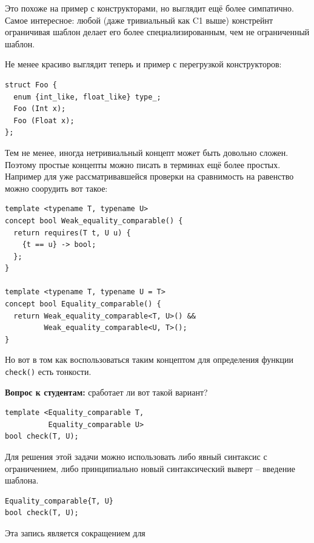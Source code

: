 \documentclass[a4paper,12pt,oneside]{book}
\newif\ifanswers
\begin{document}
Это похоже на пример с конструкторами, но выглядит ещё более симпатично. Самое интересное: любой (даже тривиальный как C1 выше) констрейнт ограничивая шаблон делает его более специализированным, чем не ограниченный шаблон.

Не менее красиво выглядит теперь и пример с перегрузкой конструкторов:

\begin{lstlisting}
struct Foo {
  enum {int_like, float_like} type_;
  Foo (Int x);
  Foo (Float x);
};
\end{lstlisting}

Тем не менее, иногда нетривиальный концепт может быть довольно сложен. Поэтому простые концепты можно писать в терминах ещё более простых. Например для уже рассматривавшейся проверки на сравнимость на равенство можно соорудить вот такое:

\begin{lstlisting}
template <typename T, typename U>
concept bool Weak_equality_comparable() {
  return requires(T t, U u) {
    {t == u} -> bool;
  };
}

template <typename T, typename U = T>
concept bool Equality_comparable() {
  return Weak_equality_comparable<T, U>() &&
         Weak_equality_comparable<U, T>();
}
\end{lstlisting}

Но вот в том как воспользоваться таким концептом для определения функции \lstinline!check()! есть тонкости.

\textbf{Вопрос к студентам:} сработает ли вот такой вариант?

\begin{lstlisting}
template <Equality_comparable T,
          Equality_comparable U>
bool check(T, U);
\end{lstlisting}

\ifanswers
Он сработает, но не так как можно ожидать: будет проверено что \lstinline!T! сравнимо с \lstinline!T! и что \lstinline!U! сравнимо с \lstinline!U!. Но программист скорее всего хочет проверить, что \lstinline!T! сравнимо с \lstinline!U!.
\fi

Для решения этой задачи можно использовать либо явный синтаксис с ограничением, либо принципиально новый синтаксический выверт -- введение шаблона.

\begin{lstlisting}
Equality_comparable{T, U}
bool check(T, U);
\end{lstlisting}

Эта запись является сокращением для
\end{document}
